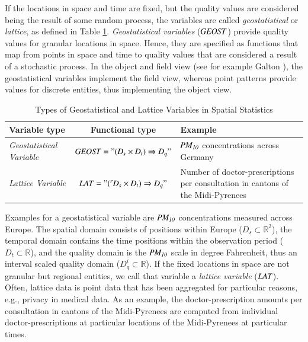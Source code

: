 \documentclass[final,authoryear,1p,times]{elsarticle}
\begin{document}
If the locations in space and time are fixed, but the quality values are considered being the result of some random process, the variables are called \textit{geostatistical} or \textit{lattice}, as defined in Table \ref{gstatVarTable}. \textit{Geostatistical variables} ($\it{GEOST}$) provide quality values for granular locations in space. Hence, they are specified as functions that map from points in space and time to quality values that are considered a result of a stochastic process. In the object and field view (see for example Galton \citep{Galton2004}), the geostatistical variables implement the field view, whereas point patterns provide values for discrete entities, thus implementing the object view. 

\begin{table}[htb]
\caption{Types of Geostatistical and Lattice Variables in Spatial Statistics}
\label{gstatVarTable}
\begin{tabular}[h]{|p{2.5cm}|c|p{5.5cm}|}
			\hline
			\textbf{Variable type} & \textbf{Functional type} &  \textbf{Example} \\
			\hline
			\textit{Geostatistical Variable} & $ \it{GEOST = "(D_s \times 				 
			  D_t) \Rightarrow D_q"}$ &  ${\it PM_{10}}$ concentrations across Germany \\
			  \hline	
			  \textit{Lattice Variable} & $ \it{LAT = "(\prescript{r}{}D_s \times D_t) \Rightarrow D_q"}$ &  Number of doctor-prescriptions
per consultation in cantons of the Midi-Pyrenees \\
			\hline
\end{tabular}
\end{table}

Examples for a geostatistical variable are ${\it PM_{10}}$  concentrations measured across Europe. The spatial domain consists of positions within Europe ($D_s \subset \mathbb{R}^2$), the temporal domain contains the time positions within the observation period ($D_t \subset \mathbb{R}$), and the quality domain is the ${\it PM_{10}}$ scale in degree Fahrenheit, thus an interval scaled quality domain ($D_{q}^i \subset \mathbb{R}$). If the fixed locations in space are not granular but regional entities, we call that variable a \textit{lattice variable} ($\it{LAT}$). Often, lattice data is point data that has been aggregated for particular reasons, e.g., privacy in medical data. As an example, the doctor-prescription amounts per consultation in cantons of the Midi-Pyrenees \citep[pp.189-191]{Cressie2011} are computed from individual doctor-prescriptions at particular locations of the Midi-Pyrenees at particular times.
\end{document}
